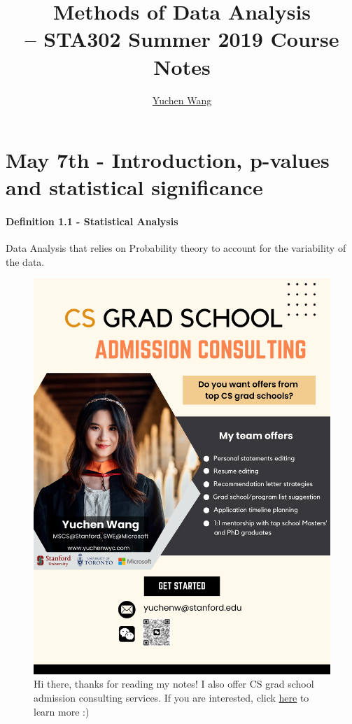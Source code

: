 \documentclass[11pt]{article}
\title{Methods of Data Analysis \\ -- STA302 Summer 2019 Course Notes}
\author{\textcolor{blue}{\href{https://www.yuchenwyc.com}{Yuchen Wang}}}
\begin{document}
    \maketitle
    \tableofcontents
    \newpage

\section{May 7th - Introduction, p-values and statistical significance}
\paragraph{Definition 1.1 - Statistical Analysis} 
Data Analysis that relies on Probability theory to account for the variability of the data.
\begin{figure}[h]
	\centering
	\includegraphics[scale=0.21]{../ad.png}
	\caption{Hi there, thanks for reading my notes! I also offer CS grad school admission consulting services. If you are interested, click \textcolor{blue}{\href{https://www.yuchenwyc.com/files/admission_consulting.pdf}{here}} to learn more :)}
\end{figure}
\end{document}

